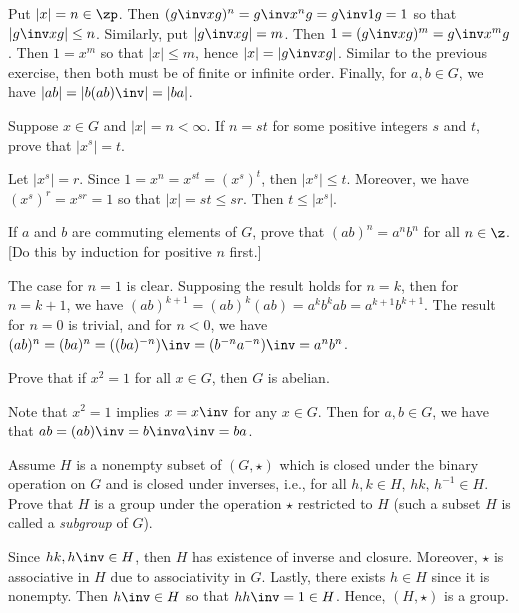 \begin{problems}
\begin{sol}
        Put $|x| = n \in \zp$. Then $(g\inv xg)^n = g\inv x^ng = g\inv 1 g = 1$ so that $|g\inv xg| \leq n$. Similarly, put $|g\inv xg| = m$. Then $1 = (g\inv xg)^m = g\inv x^mg$. Then $1 = x^m$ so that $|x| \leq m$, hence $|x| = |g\inv xg|$. Similar to the previous exercise, then both must be of finite or infinite order. Finally, for $a, b \in G$, we have $|ab| = |b(ab)\inv| = |ba|$. 
    \end{sol}
    \item Suppose $x \in G$ and $|x| = n < \infty$. If $n = st$ for some positive integers $s$ and $t$, prove that $|x^s| = t$.
    \begin{sol}
        Let $|x^s| = r$. Since $1 = x^n = x^{st} = (x^s)^t$, then $|x^s| \leq t$. Moreover, we have $(x^s)^r = x^{sr} = 1$ so that $|x| = st \leq sr$. Then $t \leq |x^s|$.
    \end{sol}
    \item If $a$ and $b$ are commuting elements of $G$, prove that $(ab)^n = a^n b^n$ for all $n \in \z$. [Do this by induction for positive $n$ first.]
    \begin{sol}
        The case for $n = 1$ is clear. Supposing the result holds for $n = k$, then for $n = k + 1$, we have $(ab)^{k + 1} = (ab)^k(ab) = a^kb^kab = a^{k + 1}b^{k + 1}$. The result for $n = 0$ is trivial, and for $n < 0$, we have $(ab)^n = (ba)^n = ((ba)^{-n})\inv = (b^{-n}a^{-n})\inv = a^nb^n$.
    \end{sol}
    \item Prove that if $x^2 = 1$ for all $x \in G$, then $G$ is abelian.\
    \begin{sol}
        Note that $x^2 = 1$ implies $x = x\inv$ for any $x \in G$. Then for $a, b \in G$, we have that $ab = (ab)\inv = b\inv a \inv = ba$.
    \end{sol}
    \item Assume $H$ is a nonempty subset of $(G, \star)$ which is closed under the binary operation on $G$ and is closed under inverses, i.e., for all $h, k \in H$, $hk, \, h^{-1} \in H$. Prove that $H$ is a group under the operation $\star$ restricted to $H$ (such a subset $H$ is called a \textit{subgroup} of $G$).
    \begin{sol}
        Since $hk, h\inv \in H$, then $H$ has existence of inverse and closure. Moreover, $\star$ is associative in $H$ due to associativity in $G$. Lastly, there exists $h \in H$ since it is nonempty. Then $h\inv \in H$ so that $hh\inv = 1 \in H$. Hence, $(H, \star)$ is a group.
    \end{sol}

\end{problems}
